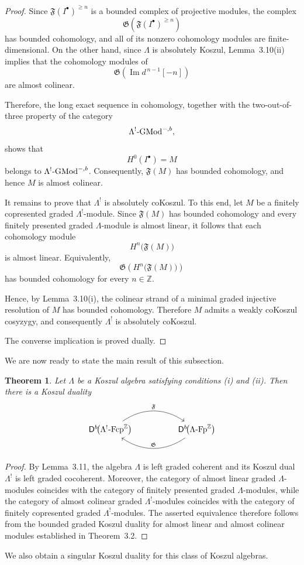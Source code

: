 \documentclass[11pt]{article}
\newtheorem{theorem}{Theorem}[section]
\theoremstyle{definition}
\theoremstyle{remark}
\begin{document}
\begin{proof}
Since \(\mathfrak{F}(I^{\bullet})^{\geq n}\) is a bounded complex of projective modules, the complex
\[
\mathfrak{G}\!\left(\mathfrak{F}(I^{\bullet})^{\geq n}\right)
\]
has bounded cohomology, and all of its nonzero cohomology modules are finite-dimensional. On the other hand, since \(\Lambda\) is absolutely Koszul, Lemma~3.10\textup{(ii)} implies that the cohomology modules of
\[
\mathfrak{G}\!\left(\operatorname{Im} d^{\,n-1}[-n]\right)
\]
are almost colinear.

Therefore, the long exact sequence in cohomology, together with the two-out-of-three property of the category
\[
\Lambda^{!}\textup{-}\mathrm{GMod}^{-,b},
\]
shows that
\[
H^0(I^{\bullet})=M
\]
belongs to \(\Lambda^{!}\textup{-}\mathrm{GMod}^{-,b}\). Consequently,
\(\mathfrak{F}(M)\) has bounded cohomology, and hence \(M\) is almost colinear.

It remains to prove that \(\Lambda^{!}\) is absolutely coKoszul. To this end, let \(M\) be a finitely copresented graded \(\Lambda^{!}\)-module. Since \(\mathfrak{F}(M)\) has bounded cohomology and every finitely presented graded \(\Lambda\)-module is almost linear, it follows that each cohomology module
\[
H^{n}\!\bigl(\mathfrak{F}(M)\bigr)
\]
is almost linear. Equivalently,
\[
\mathfrak{G}\!\left(H^{n}\!\bigl(\mathfrak{F}(M)\bigr)\right)
\]
has bounded cohomology for every \(n\in\mathbb Z\).

Hence, by Lemma~3.10\textup{(i)}, the colinear strand of a minimal graded injective resolution of \(M\) has bounded cohomology. Therefore \(M\) admits a weakly coKoszul cosyzygy, and consequently \(\Lambda^{!}\) is absolutely coKoszul.

The converse implication is proved dually.
\end{proof}
We are now ready to state the main result of this subsection.

\begin{theorem}
Let \(\Lambda\) be a Koszul algebra satisfying conditions \textup{(i)} and \textup{(ii)}. Then there is a Koszul duality
\[
\begin{tikzcd}[column sep=huge]
\mathsf{D}^{b}\!\bigl(\Lambda^{!}\textup{-}\mathrm{Fcp}^{\mathbb{Z}}\bigr)
\arrow[r, bend left=35, "\mathfrak{F}"]
&
\mathsf{D}^{b}\!\bigl(\Lambda\textup{-}\mathrm{Fp}^{\mathbb{Z}}\bigr)
\arrow[l, bend left=35, "\mathfrak{G}"']
\end{tikzcd}
\]
\end{theorem}
\begin{proof}
By Lemma~3.11, the algebra \(\Lambda\) is left graded coherent and its Koszul dual
\(\Lambda^{!}\) is left graded cocoherent. Moreover, the category of almost linear
graded \(\Lambda\)-modules coincides with the category of finitely presented graded
\(\Lambda\)-modules, while the category of almost colinear graded \(\Lambda^{!}\)-modules
coincides with the category of finitely copresented graded \(\Lambda^{!}\)-modules.
The asserted equivalence therefore follows from the bounded graded Koszul duality
for almost linear and almost colinear modules established in Theorem~3.2.
\end{proof}
We also obtain a singular Koszul duality for this class of Koszul algebras.
\end{document}
